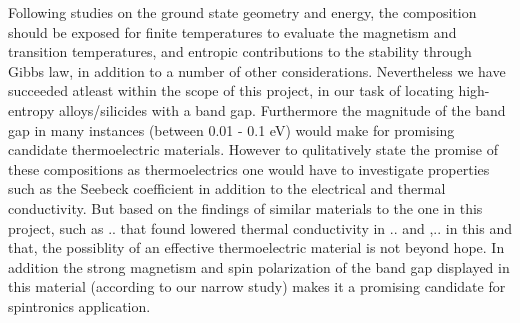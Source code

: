 Following studies on the ground state geometry and energy, the composition should be exposed for finite temperatures to evaluate the magnetism and transition temperatures, and entropic contributions to the stability through Gibbs law, in addition to a number of other considerations. Nevertheless we have succeeded atleast within the scope of this project, in our task of locating high-entropy alloys/silicides with a band gap. Furthermore the magnitude of the band gap in many instances (between 0.01 - 0.1 eV) would make for promising candidate thermoelectric materials. However to qulitatively state the promise of these compositions as thermoelectrics one would have to investigate properties such as the Seebeck coefficient in addition to the electrical and thermal conductivity. But based on the findings of similar materials to the one in this project, such as .. that found lowered thermal conductivity in .. and ,.. in this and that, the possiblity of an effective thermoelectric material is not beyond hope. In addition the strong magnetism and spin polarization of the band gap displayed in this material (according to our narrow study) makes it a promising candidate for spintronics application. 


 